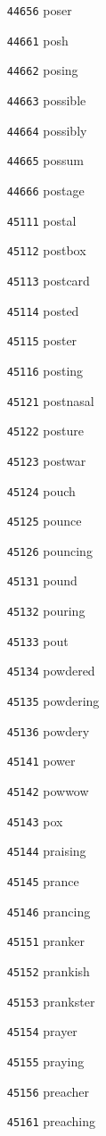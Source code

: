 \documentclass[twoside,11pt]{article}
\begin{document}
\begin{multicols}{5}
\begin{enumerate}
\item[\texttt{44656}] poser
\item[\texttt{44661}] posh
\item[\texttt{44662}] posing
\item[\texttt{44663}] possible
\item[\texttt{44664}] possibly
\item[\texttt{44665}] possum
\item[\texttt{44666}] postage
\item[\texttt{45111}] postal
\item[\texttt{45112}] postbox
\item[\texttt{45113}] postcard
\item[\texttt{45114}] posted
\item[\texttt{45115}] poster
\item[\texttt{45116}] posting
\item[\texttt{45121}] postnasal
\item[\texttt{45122}] posture
\item[\texttt{45123}] postwar
\item[\texttt{45124}] pouch
\item[\texttt{45125}] pounce
\item[\texttt{45126}] pouncing
\item[\texttt{45131}] pound
\item[\texttt{45132}] pouring
\item[\texttt{45133}] pout
\item[\texttt{45134}] powdered
\item[\texttt{45135}] powdering
\item[\texttt{45136}] powdery
\item[\texttt{45141}] power
\item[\texttt{45142}] powwow
\item[\texttt{45143}] pox
\item[\texttt{45144}] praising
\item[\texttt{45145}] prance
\item[\texttt{45146}] prancing
\item[\texttt{45151}] pranker
\item[\texttt{45152}] prankish
\item[\texttt{45153}] prankster
\item[\texttt{45154}] prayer
\item[\texttt{45155}] praying
\item[\texttt{45156}] preacher
\item[\texttt{45161}] preaching

\end{enumerate}
\end{multicols}
\end{document}
